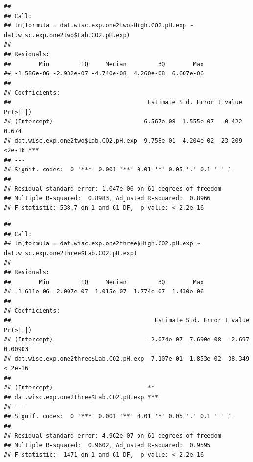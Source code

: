 \documentclass[]{article}
\newenvironment{Shaded}{\begin{snugshade}}{\end{snugshade}}
\newcommand{\KeywordTok}[1]{\textcolor[rgb]{0.13,0.29,0.53}{\textbf{#1}}}
\newcommand{\NormalTok}[1]{#1}
\newcommand{\OperatorTok}[1]{\textcolor[rgb]{0.81,0.36,0.00}{\textbf{#1}}}
\newcommand{\StringTok}[1]{\textcolor[rgb]{0.31,0.60,0.02}{#1}}
\begin{document}
\begin{verbatim}
## 
## Call:
## lm(formula = dat.wisc.exp.one2two$High.CO2.pH.exp ~ dat.wisc.exp.one2two$Lab.CO2.pH.exp)
## 
## Residuals:
##        Min         1Q     Median         3Q        Max 
## -1.586e-06 -2.932e-07 -4.740e-08  4.260e-08  6.607e-06 
## 
## Coefficients:
##                                       Estimate Std. Error t value Pr(>|t|)    
## (Intercept)                         -6.567e-08  1.555e-07  -0.422    0.674    
## dat.wisc.exp.one2two$Lab.CO2.pH.exp  9.758e-01  4.204e-02  23.209   <2e-16 ***
## ---
## Signif. codes:  0 '***' 0.001 '**' 0.01 '*' 0.05 '.' 0.1 ' ' 1
## 
## Residual standard error: 1.047e-06 on 61 degrees of freedom
## Multiple R-squared:  0.8983, Adjusted R-squared:  0.8966 
## F-statistic: 538.7 on 1 and 61 DF,  p-value: < 2.2e-16
\end{verbatim}

\begin{Shaded}
\end{Shaded}

\begin{verbatim}
## 
## Call:
## lm(formula = dat.wisc.exp.one2three$High.CO2.pH.exp ~ dat.wisc.exp.one2three$Lab.CO2.pH.exp)
## 
## Residuals:
##        Min         1Q     Median         3Q        Max 
## -1.611e-06 -2.007e-07  1.015e-07  1.774e-07  1.430e-06 
## 
## Coefficients:
##                                         Estimate Std. Error t value Pr(>|t|)
## (Intercept)                           -2.074e-07  7.690e-08  -2.697  0.00903
## dat.wisc.exp.one2three$Lab.CO2.pH.exp  7.107e-01  1.853e-02  38.349  < 2e-16
##                                          
## (Intercept)                           ** 
## dat.wisc.exp.one2three$Lab.CO2.pH.exp ***
## ---
## Signif. codes:  0 '***' 0.001 '**' 0.01 '*' 0.05 '.' 0.1 ' ' 1
## 
## Residual standard error: 4.962e-07 on 61 degrees of freedom
## Multiple R-squared:  0.9602, Adjusted R-squared:  0.9595 
## F-statistic:  1471 on 1 and 61 DF,  p-value: < 2.2e-16
\end{verbatim}
\end{document}

